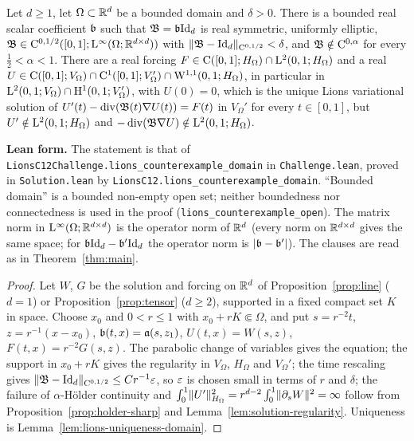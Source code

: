 \begin{corollary}
  \label{cor:bounded-domains}
  \leanok
  Let $d\geq1$, let $\Omega\subset\mathbb{R}^d$ be a bounded domain and $\delta>0$.  There is a bounded
  real scalar coefficient $\mathfrak{b}$ such that $\mathfrak{B}=\mathfrak{b}\mathrm{Id}_d$ is real symmetric, uniformly
  elliptic, $\mathfrak{B}\in\mathrm{C}^{0,1/2}([0,1];\mathrm{L}^\infty(\Omega;\mathbb{R}^{d\times d}))$ with
  $\lVert \mathfrak{B}-\mathrm{Id}_d\rVert_{\mathrm{C}^{0,1/2}}<\delta$, and $\mathfrak{B}\notin\mathrm{C}^{0,\alpha}$ for every
  $\frac12<\alpha<1$.  There are a real forcing $F\in\mathrm{C}([0,1];H_\Omega)\cap\mathrm{L}^2(0,1;H_\Omega)$
  and a real $U\in\mathrm{C}([0,1];V_\Omega)\cap\mathrm{C}^1([0,1];V_\Omega')\cap\mathrm{W}^{1,1}(0,1;H_\Omega)$, in
  particular in $\mathrm{L}^2(0,1;V_\Omega)\cap\mathrm{H}^1(0,1;V_\Omega')$, with $U(0)=0$, which is the unique
  Lions variational solution of $U'(t)-\operatorname{div}(\mathfrak{B}(t)\nabla U(t))=F(t)$ in $V_\Omega'$ for every
  $t\in[0,1]$, but $U'\notin\mathrm{L}^2(0,1;H_\Omega)$ and
  $-\operatorname{div}(\mathfrak{B}\nabla U)\notin\mathrm{L}^2(0,1;H_\Omega)$.
\end{corollary}

\textbf{Lean form.}  The statement is that of
\texttt{LionsC12Challenge.lions\_counterexample\_domain} in \texttt{Challenge.lean}, proved in
\texttt{Solution.lean} by \texttt{LionsC12.lions\_counterexample\_domain}.  ``Bounded domain'' is a bounded non-empty open set; neither boundedness nor
connectedness is used in the proof (\texttt{lions\_counterexample\_open}).  The matrix norm in $\mathrm{L}^\infty(\Omega;\mathbb{R}^{d\times d})$ is the operator norm of $\mathbb{R}^d$
(every norm on $\mathbb{R}^{d\times d}$ gives the same space; for $\mathfrak{b}\mathrm{Id}_d-\mathfrak{b}'\mathrm{Id}_d$ the operator norm
is $\lvert \mathfrak{b}-\mathfrak{b}'\rvert$).  The clauses are read as in Theorem~\ref{thm:main}.

\begin{proof}
  \leanok
  Let $W$, $G$ be the solution and forcing on $\mathbb{R}^d$ of Proposition~\ref{prop:line} ($d=1$) or
  Proposition~\ref{prop:tensor} ($d\geq2$), supported in a fixed compact set $K$ in space.
  Choose $x_0$ and $0<r\leq1$ with $x_0+rK\Subset\Omega$, and put $s=r^{-2}t$,
  $z=r^{-1}(x-x_0)$, $\mathfrak{b}(t,x)=\mathfrak{a}(s,z_1)$, $U(t,x)=W(s,z)$, $F(t,x)=r^{-2}G(s,z)$.  The
  parabolic change of variables gives the equation; the support in $x_0+rK$ gives the
  regularity in $V_\Omega$, $H_\Omega$ and $V_\Omega'$; the time rescaling gives
  $\lVert \mathfrak{B}-\mathrm{Id}_d\rVert_{\mathrm{C}^{0,1/2}}\leq Cr^{-1}\varepsilon$, so $\varepsilon$ is chosen small in terms of $r$ and
  $\delta$; the failure of $\alpha$-H\"older continuity and
  $\int_0^1\lVert U'\rVert_{H_\Omega}^2=r^{d-2}\int_0^1\lVert \partial_sW\rVert^2=\infty$ follow from
  Proposition~\ref{prop:holder-sharp} and Lemma~\ref{lem:solution-regularity}.  Uniqueness is
  Lemma~\ref{lem:lions-uniqueness-domain}.
\end{proof}
